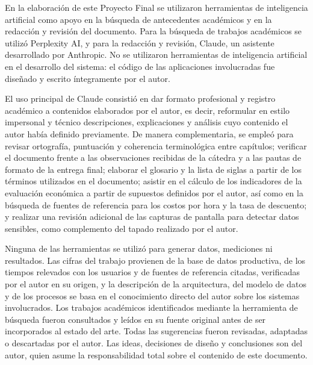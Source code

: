 En la elaboración de este Proyecto Final se utilizaron herramientas de inteligencia artificial como apoyo en la búsqueda de antecedentes académicos y en la redacción y revisión del documento. Para la búsqueda de trabajos académicos se utilizó Perplexity AI, y para la redacción y revisión, Claude, un asistente desarrollado por Anthropic. No se utilizaron herramientas de inteligencia artificial en el desarrollo del sistema: el código de las aplicaciones involucradas fue diseñado y escrito íntegramente por el autor.

El uso principal de Claude consistió en dar formato profesional y registro académico a contenidos elaborados por el autor, es decir, reformular en estilo impersonal y técnico descripciones, explicaciones y análisis cuyo contenido el autor había definido previamente. De manera complementaria, se empleó para revisar ortografía, puntuación y coherencia terminológica entre capítulos; verificar el documento frente a las observaciones recibidas de la cátedra y a las pautas de formato de la entrega final; elaborar el glosario y la lista de siglas a partir de los términos utilizados en el documento; asistir en el cálculo de los indicadores de la evaluación económica a partir de supuestos definidos por el autor, así como en la búsqueda de fuentes de referencia para los costos por hora y la tasa de descuento; y realizar una revisión adicional de las capturas de pantalla para detectar datos sensibles, como complemento del tapado realizado por el autor.

Ninguna de las herramientas se utilizó para generar datos, mediciones ni resultados. Las cifras del trabajo provienen de la base de datos productiva, de los tiempos relevados con los usuarios y de fuentes de referencia citadas, verificadas por el autor en su origen, y la descripción de la arquitectura, del modelo de datos y de los procesos se basa en el conocimiento directo del autor sobre los sistemas involucrados. Los trabajos académicos identificados mediante la herramienta de búsqueda fueron consultados y leídos en su fuente original antes de ser incorporados al estado del arte. Todas las sugerencias fueron revisadas, adaptadas o descartadas por el autor. Las ideas, decisiones de diseño y conclusiones son del autor, quien asume la responsabilidad total sobre el contenido de este documento.
